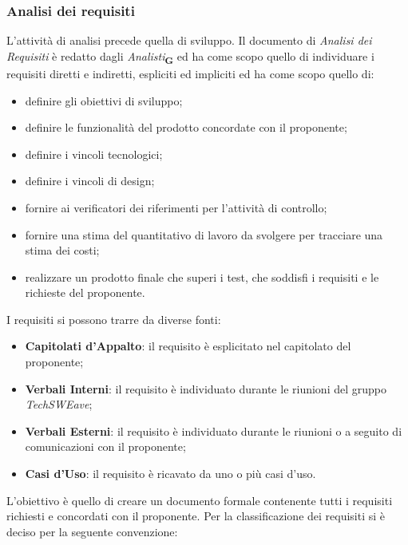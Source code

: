 \subsubsection{Analisi dei requisiti}
L’attività di analisi precede quella di sviluppo. Il documento di \textit{Analisi dei Requisiti} è redatto dagli \textit{Analisti}\textsubscript{\textbf{G}} ed ha come scopo quello di individuare i requisiti diretti e indiretti, espliciti ed impliciti ed ha come scopo quello di:
\begin{itemize}
    \item definire gli obiettivi di sviluppo;
    \item definire le funzionalità del prodotto concordate con il proponente;
    \item definire i vincoli tecnologici;
    \item definire i vincoli di design;
    \item fornire ai verificatori dei riferimenti per l’attività di controllo;
    \item fornire una stima del quantitativo di lavoro da svolgere per tracciare una stima dei costi;
    \item realizzare un prodotto finale che superi i test, che soddisfi i requisiti e le richieste del proponente.
\end{itemize}
I requisiti si possono trarre da diverse fonti:
\begin{itemize}
    \item \textbf{Capitolati d'Appalto}: il requisito è esplicitato nel capitolato del proponente;
    \item \textbf{Verbali Interni}: il requisito è individuato durante le riunioni del gruppo \textit{TechSWEave};
    \item \textbf{Verbali Esterni}: il requisito è individuato durante le riunioni o a seguito di comunicazioni con il proponente;
    \item \textbf{Casi d'Uso}: il requisito è ricavato da uno o più casi d’uso.
\end{itemize}
L’obiettivo è quello di creare un documento formale contenente tutti i requisiti richiesti e concordati con il proponente.
Per la classificazione dei requisiti si è deciso per la seguente convenzione:

